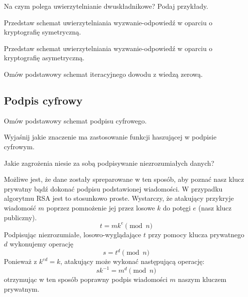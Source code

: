 \documentclass[answers,11pt]{exam}
\begin{document}
\begin{questions}
\question Na czym polega uwierzytelnianie dwuskładnikowe? Podaj przykłady.

\question Przedstaw schemat uwierzytelniania wyzwanie-odpowiedź w oparciu o kryptografię symetryczną.

\question Przedstaw schemat uwierzytelniania wyzwanie-odpowiedź w oparciu o kryptografię asymetryczną.

\question Omów podstawowy schemat iteracyjnego dowodu z wiedzą zerową.

\end{questions}


\subsection{Podpis cyfrowy}

\begin{questions}

\question Omów podstawowy schemat podpisu cyfrowego.

\question Wyjaśnij jakie znaczenie ma zastosowanie funkcji haszującej w podpisie cyfrowym.

\question Jakie zagrożenia niesie za sobą podpisywanie niezrozumiałych danych?
\begin{solution}
Możliwe jest, że dane zostały spreparowane w ten sposób, aby poznać nasz klucz prywatny bądź dokonać podpisu podstawionej wiadomości. W przypadku algorytmu RSA jest to stosunkowo proste. Wystarczy, że atakujący przykryje wiadomość $m$ poprzez pomnożenie jej przez losowe $k$ do potęgi $e$ (nasz klucz publiczny). 
\begin{equation}
t = m k^e \pmod{n}
\end{equation}
Podpisując niezrozumiałe, losowo-wyglądające $t$ przy pomocy klucza prywatnego $d$ wykonujemy operację
\begin{equation}
s = t^d \pmod{n}
\end{equation}
Ponieważ z $k^{ed} = k$, atakujący może wykonać następującą operację:
\begin{equation}
sk^{-1} = m^d \pmod{n}
\end{equation}
otrzymując w ten sposób poprawny podpis wiadomości $m$ naszym kluczem prywatnym.
\end{solution}

\end{questions}
\end{document}
